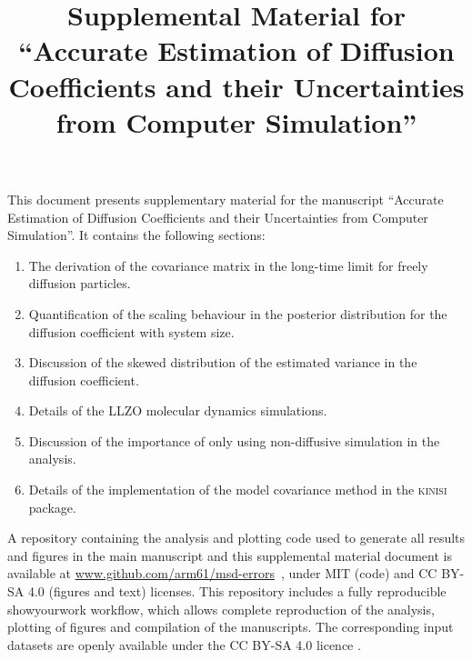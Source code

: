 \documentclass[reprint,superscriptaddress,nobibnotes,amsmath,amssymb,aps,prx,hidelinks]{revtex4-2}
\makeatletter
\newcommand{\papertitle}{Accurate Estimation of Diffusion Coefficients and their Uncertainties from Computer Simulation}
\newcommand{\code}[1]{#1}
\def\maketitle{
\@author@finish
\title@column\titleblock@produce
\suppressfloats[t]}
\makeatother
\begin{document}
\title{Supplemental Material for ``\papertitle''}
\maketitle
\onecolumngrid

This document presents supplementary material for the manuscript ``\papertitle''.
It contains the following sections:
\begin{enumerate}
    \item The derivation of the covariance matrix in the long-time limit for freely diffusion particles.
    \item Quantification of the scaling behaviour in the posterior distribution for the diffusion coefficient with system size.
    \item Discussion of the skewed distribution of the estimated variance in the diffusion coefficient.
    \item Details of the LLZO molecular dynamics simulations.
    \item Discussion of the importance of only using non-diffusive simulation in the analysis.
    \item Details of the implementation of the model covariance method in the \textsc{kinisi} package.
\end{enumerate}
A repository containing the analysis and plotting code used to generate all results and figures in the main manuscript and this supplemental material document is available at \url{www.github.com/arm61/msd-errors}~\cite{mccluskey_github_2022}, under MIT (code) and CC BY-SA 4.0 (figures and text) licenses.
This repository includes a fully reproducible \code{showyourwork} workflow, which allows complete reproduction of the analysis, plotting of figures and compilation of the manuscripts.
The corresponding input datasets are openly available under the CC BY-SA 4.0 licence \cite{mccluskey_zenodo_2022,coles_llzo_zenodo_2022}. 

\vspace{\columnsep}
\twocolumngrid
\end{document}
